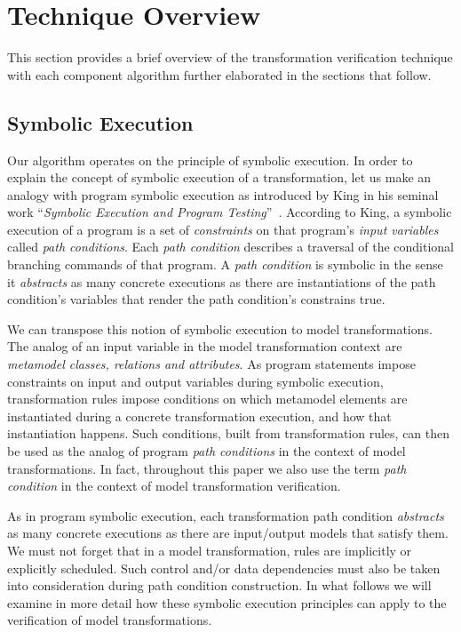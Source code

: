 \section{Technique Overview}
\label{sec:overview}
 
This section provides a brief overview of the transformation verification
technique with each component algorithm further elaborated in the sections that follow.

\subsection{Symbolic Execution}

Our algorithm operates on the principle of symbolic execution. In order to
explain the concept of symbolic execution of a transformation, let us make an
analogy with program symbolic execution as introduced by King in his seminal
work ``\emph{Symbolic Execution and Program
Testing}''~\cite{DBLP:journals/cacm/King76}. According to King, a symbolic
execution of a program is a set of \emph{constraints} on that program's
\emph{input variables} called \emph{path conditions}. Each \emph{path condition}
describes a traversal of the conditional branching commands of that program. A
\emph{path condition} is symbolic in the sense it \emph{abstracts} as many
concrete executions as there are instantiations of the path condition's
variables that render the path condition's constrains true.

We can transpose this notion of symbolic execution to model transformations. The
analog of an input variable in the model transformation context are
\emph{metamodel classes, relations and attributes}. As program statements impose
constraints on input and output variables during symbolic execution,
transformation rules impose conditions on which metamodel elements are
instantiated during a concrete transformation execution, and how that
instantiation happens.
Such conditions, built from transformation rules, can then be used as the analog
of program \emph{path conditions} in the context of model transformations. In
fact, throughout this paper we also use the term
\emph{path condition} in the context of model transformation verification.

As in program symbolic execution, each transformation path condition
\emph{abstracts} as many concrete executions as there are input/output models
that satisfy them. We must not forget that in a model transformation, rules are
implicitly or explicitly scheduled. Such control and/or data dependencies must
also be taken into consideration during path condition construction. In what
follows we will examine in more detail how these symbolic execution principles can
apply to the verification of model transformations.

